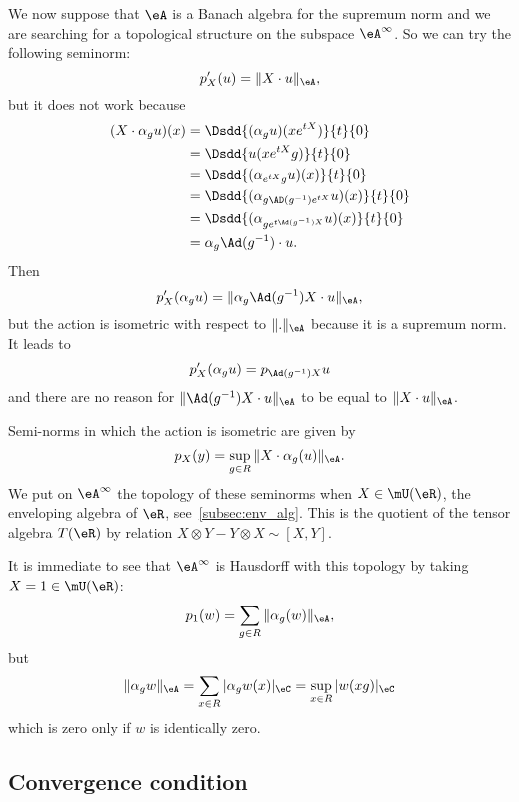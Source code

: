 We now suppose that $\eA$ is a Banach algebra for the supremum norm and we are searching for a topological structure on the subspace $\eA^{\infty}$. So we can try the following seminorm:
\begin{equation}
	p'_X(u)=\| X\cdot u \|_{\eA},
\end{equation}
but it does not work because
\begin{equation}
	\begin{split}
		(X\cdot \alpha_gu)(x)&=\Dsdd{ (\alpha_gu)(xe^{tX}) }{t}{0}\\
		&=\Dsdd{ u(xe^{tX}g) }{t}{0}\\
		&=\Dsdd{ (\alpha_{e^{tX}g}u)(x) }{t}{0}\\
		&=\Dsdd{ (\alpha_{g\AD(g^{-1})e^{tX}}u)(x) }{t}{0}\\
		&=\Dsdd{ (\alpha_{ge^{t\Ad(g^{-1})X}}u)(x) }{t}{0}\\
		&=\alpha_g\Ad(g^{-1})\cdot u.
	\end{split}
\end{equation}
Then
\[
	p'_X(\alpha_gu)=\| \alpha_g\Ad(g^{-1})X\cdot u \|_{\eA},
\]
but the action is isometric with respect to $\| . \|_{\eA}$ because it is a supremum norm. It leads to
\[
	p'_X(\alpha_gu)=p_{\Ad(g^{-1})X}u
\]
and there are no reason for $\| \Ad(g^{-1})X\cdot u \|_{\eA}$ to be equal to $\| X\cdot u \|_{\eA}$.

Semi-norms in which the action is isometric are given by
\begin{equation}
	p_X(y)=\sup_{g\in R}\| X\cdot \alpha_g(u) \|_{\eA}.
\end{equation}
We put on $\eA^{\infty}$ the topology of these seminorms when $X\in\mU(\eR)$, the enveloping algebra of $\eR$, see~\ref{subsec:env_alg}. This is the quotient of the tensor algebra $T(\eR)$ by relation $X\otimes Y-Y\otimes X\sim [X,Y]$.

It is immediate to see that $\eA^{\infty}$ is Hausdorff with this topology by taking $X=1\in\mU(\eR)$:
\[
	p_1(w)=\sum_{g\in R}\| \alpha_g(w) \|_{\eA},
\]
but
\begin{equation}
	\| \alpha_g w \|_{\eA}=\sum_{x\in R}| \alpha_g w(x) |_{\eC}
	=\sup_{x\in R}| w(xg) |_{\eC}
\end{equation}
which is zero only if $w$ is identically zero.



\subsection{Convergence condition}

